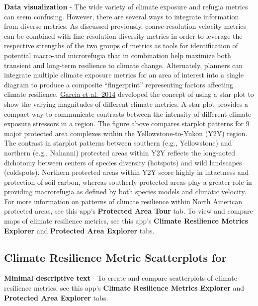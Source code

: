 \documentclass[
]{article}
\begin{document}
\textbf{Data visualization} - The wide variety of climate exposure and
refugia metrics can seem confusing. However, there are several ways to
integrate information from diverse metrics. As discussed previously,
coarse-resolution velocity metrics can be combined with fine-resolution
diversity metrics in order to leverage the respective strengths of the
two groups of metrics as tools for identification of potential macro-and
microrefugia that in combination help maximize both transient and
long-term resilience to climate change. Alternately, planners can
integrate multiple climate exposure metrics for an area of interest into
a single diagram to produce a composite ``fingerprint'' representing
factors affecting climate resilience.
\href{http://science.sciencemag.org/content/344/6183/1247579}{Garcia et
al.~2014} developed the concept of using a star plot to show the varying
magnitudes of different climate metrics. A star plot provides a compact
way to communicate contrasts between the intensity of different climate
exposure stressors in a region. The figure above compares starplot
patterns for 9 major protected area complexes within the
Yellowstone-to-Yukon (Y2Y) region. The contrast in starplot patterns
between southern (e.g., Yellowstone) and northern (e.g., Nahanni)
protected areas within Y2Y reflects the long-noted dichotomy between
centers of species diversity (hotspots) and wild landscapes (coldspots).
Northern protected areas within Y2Y score highly in intactness and
protection of soil carbon, whereas southerly protected areas play a
greater role in providing macrorefugia as defined by both species models
and climatic velocity. For more information on patterns of climate
resilience within North American protected areas, see this app's
\textbf{Protected Area Tour} tab. To view and compare maps of climate
resilience metrics, see this app's \textbf{Climate Resilience Metrics
Explorer} and \textbf{Protected Area Explorer} tabs.

\hypertarget{climate-resilience-metric-scatterplots-for}{%
\subsection{Climate Resilience Metric Scatterplots
for}\label{climate-resilience-metric-scatterplots-for}}

\textbf{Minimal descriptive text} - To create and compare scatterplots
of climate resilience metrics, see this app's \textbf{Climate Resilience
Metrics Explorer} and \textbf{Protected Area Explorer} tabs.
\end{document}
